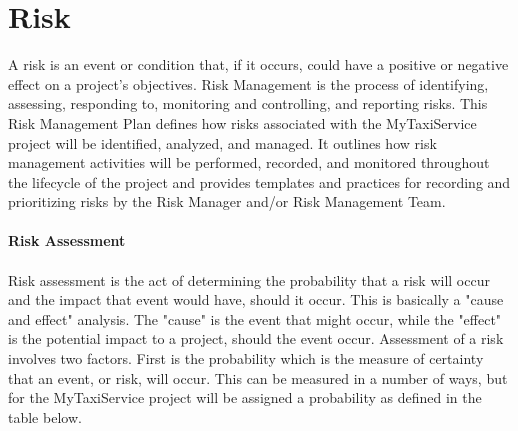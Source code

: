 \documentclass[12pt, oneside]{book}   	%
\begin{document}
\section{Risk}
A risk is an event or condition that, if it occurs, could have a positive or negative effect on a project's objectives. Risk Management is the process of identifying, assessing, responding to, monitoring and controlling, and reporting risks. This Risk Management Plan defines how risks associated with the MyTaxiService project will be identified, analyzed, and managed. It outlines how risk management activities will be performed, recorded, and monitored throughout the lifecycle of the project and provides templates and practices for recording and prioritizing risks by the Risk Manager and/or Risk Management Team.
\\
\\
\textbf{\large{Risk Assessment}}
\\
\\
Risk assessment is the act of determining the probability that a risk will occur and the impact that event would have, should it occur. This is basically a "cause and effect" analysis. The "cause" is the event that might occur, while the "effect" is the potential impact to a project, should the event occur. Assessment of a risk involves two factors. First is the probability which is the measure of certainty that an event, or risk, will occur. This can be measured in a number of ways, but for the MyTaxiService project will be assigned a probability as defined in the table below.
\\
\end{document}
